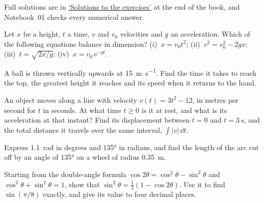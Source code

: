 \label{sec:mo-exercises}

Full solutions are in \hyperref[sec:mo-solutions]{`Solutions to the
exercises'} at the end of the book, and Notebook~01 checks every
numerical answer.

\begin{exercise}[dimensions]
\label{ex:mo-dimensions}
Let $x$ be a height, $t$ a time, $v$ and $v_0$ velocities and $g$ an
acceleration. Which of the following equations balance in dimension?
(i)~$x = v_0 t^2$; (ii)~$v^2 = v_0^2 - 2gx$; (iii)~$t = \sqrt{2x/g}$;
(iv)~$x = v_0\,\mathrm{e}^{-gt}$.
\end{exercise}

\begin{exercise}
\label{ex:mo-throw}
A ball is thrown vertically upwards at \SI{15}{\metre\per\second}. Find the
time it takes to reach the top, the greatest height it reaches and its
speed when it returns to the hand.
\end{exercise}

\begin{exercise}
\label{ex:mo-distance}
An object moves along a line with velocity $v(t) = 3t^2 - 12$, in metres
per second for $t$ in seconds. At what time $t \ge 0$ is it at rest, and
what is its acceleration at that instant? Find its displacement between $t
= 0$ and $t = \SI{3}{\second}$, and the total distance it travels over the
same interval, $\int\lvert v\rvert\,\dd t$.
\end{exercise}

\begin{exercise}[radians]
\label{ex:mo-radians}
Express \SI{1.1}{\radian} in degrees and \ang{135} in radians, and find
the length of the arc cut off by an angle of \ang{135} on a wheel of
radius \SI{0.35}{\metre}.
\end{exercise}

\begin{exercise}[an identity]
\label{ex:mo-identity}
Starting from the double-angle formula $\cos 2\theta = \cos^2\theta -
\sin^2\theta$ and $\cos^2\theta + \sin^2\theta = 1$, show that $\sin^2
\theta = \tfrac12(1 - \cos2\theta)$. Use it to find $\sin(\pi/8)$ exactly,
and give its value to four decimal places.
\end{exercise}


